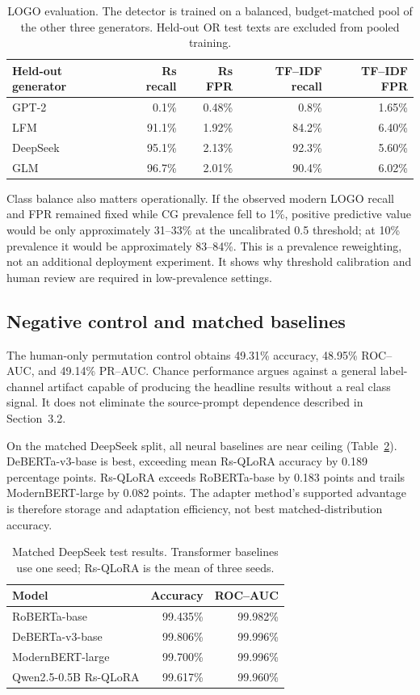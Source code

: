 \documentclass[utf8]{FrontiersinHarvard}
\begin{document}
\begin{table}[h!]
\centering
\caption{LOGO evaluation. The detector is trained on a balanced, budget-matched pool of the other three generators. Held-out OR test texts are excluded from pooled training.}
\label{tab:logo}
\begin{tabular}{lrrrr}
\toprule
Held-out generator & Rs recall & Rs FPR & TF--IDF recall & TF--IDF FPR \\
\midrule
GPT-2 & 0.1\% & 0.48\% & 0.8\% & 1.65\% \\
LFM & 91.1\% & 1.92\% & 84.2\% & 6.40\% \\
DeepSeek & 95.1\% & 2.13\% & 92.3\% & 5.60\% \\
GLM & 96.7\% & 2.01\% & 90.4\% & 6.02\% \\
\bottomrule
\end{tabular}
\end{table}

Class balance also matters operationally. If the observed modern LOGO recall and FPR remained fixed while CG prevalence fell to 1\%, positive predictive value would be only approximately 31--33\% at the uncalibrated 0.5 threshold; at 10\% prevalence it would be approximately 83--84\%. This is a prevalence reweighting, not an additional deployment experiment. It shows why threshold calibration and human review are required in low-prevalence settings.

\subsection{Negative control and matched baselines}

The human-only permutation control obtains 49.31\% accuracy, 48.95\% ROC--AUC, and 49.14\% PR--AUC. Chance performance argues against a general label-channel artifact capable of producing the headline results without a real class signal. It does not eliminate the source-prompt dependence described in Section~3.2.

On the matched DeepSeek split, all neural baselines are near ceiling (Table~\ref{tab:baselines}). DeBERTa-v3-base is best, exceeding mean Rs-QLoRA accuracy by 0.189 percentage points. Rs-QLoRA exceeds RoBERTa-base by 0.183 points and trails ModernBERT-large by 0.082 points. The adapter method's supported advantage is therefore storage and adaptation efficiency, not best matched-distribution accuracy.

\begin{table}[h!]
\centering
\caption{Matched DeepSeek test results. Transformer baselines use one seed; Rs-QLoRA is the mean of three seeds.}
\label{tab:baselines}
\begin{tabular}{lrr}
\toprule
Model & Accuracy & ROC--AUC \\
\midrule
RoBERTa-base & 99.435\% & 99.982\% \\
DeBERTa-v3-base & 99.806\% & 99.996\% \\
ModernBERT-large & 99.700\% & 99.996\% \\
Qwen2.5-0.5B Rs-QLoRA & 99.617\% & 99.960\% \\
\bottomrule
\end{tabular}
\end{table}
\end{document}
